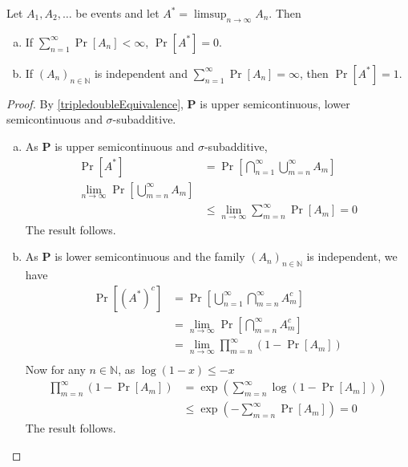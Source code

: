 \begin{theorem}
\label{borelCantelliLemma}
    Let $A_1,A_2,\ldots$ be events and let $A^*=\limsup_{n\to\infty} A_n$. Then
    \begin{enumerate}[(a)]
        \item If $\sum_{n=1}^\infty \Pr[A_n]<\infty$, $\Pr[A^*]=0$.
        \item If $(A_n)_{n\in\mathbb{N}}$ is independent and $\sum_{n=1}^\infty \Pr[A_n]=\infty$, then $\Pr[A^*]=1$.
    \end{enumerate}
\end{theorem}
\begin{proof}
    By \cref{tripledoubleEquivalence}, $\textbf{P}$ is upper semicontinuous, lower semicontinuous and $\sigma$-subadditive.
    \begin{enumerate}[(a)]
        \item As $\textbf{P}$ is upper semicontinuous and $\sigma$-subadditive,
        \begin{align*}
            \Pr[A^*] &= \Pr\left[\bigcap_{n=1}^\infty\bigcup_{m=n}^\infty A_m\right] \\
            \lim_{n\to\infty}\Pr\left[\bigcup_{m=n}^\infty A_m\right] \\
            &\leq \lim_{n\to\infty} \sum_{m=n}^\infty \Pr[A_m] = 0
        \end{align*}
        The result follows.
        
        \item As $\textbf{P}$ is lower semicontinuous and the family $(A_n)_{n\in\mathbb{N}}$ is independent, we have
        \begin{align*}
            \Pr[(A^*)^c] &= \Pr\left[\bigcup_{n=1}^\infty\bigcap_{m=n}^\infty A_m^c\right] \\
            &= \lim_{n\to\infty} \Pr\left[\bigcap_{m=n}^\infty A_m^c\right] \\
            &= \lim_{n\to\infty} \prod_{m=n}^\infty \left(1-\Pr[A_m]\right) \\
        \end{align*}
        Now for any $n\in\mathbb{N}$, as $\log(1-x)\leq -x$
        \begin{align*}
            \prod_{m=n}^\infty \left(1-\Pr[A_m]\right)&= \exp\left(\sum_{m=n}^\infty \log(1-\Pr[A_m])\right) \\
            &\leq \exp\left(-\sum_{m=n}^\infty \Pr[A_m]\right) = 0
        \end{align*}
        The result follows.
    \end{enumerate}
\end{proof}


